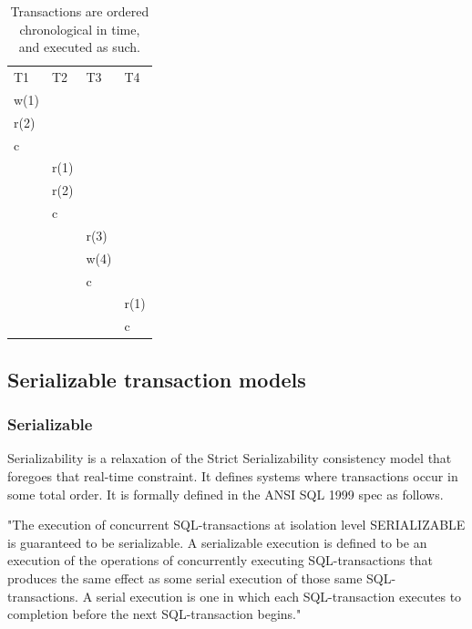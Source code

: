 \documentclass[a4paper,10pt,titlepage]{report}
\begin{document}
    \begin{table}[h]
        \begin{tabular}{l|l|l|l}
            T1   & T2   & T3   & T4   \\
            w(1) &      &      &      \\
            r(2) &      &      &      \\
            c    &      &      &      \\
            & r(1) &      &      \\
            & r(2) &      &      \\
            & c    &      &      \\
            &      & r(3) &      \\
            &      & w(4) &      \\
            &      & c    &      \\
            &      &      & r(1) \\
            &      &      & c
        \end{tabular}
        \caption{Transactions are ordered chronological in time, and executed as such.}

    \end{table}

    \subsection{Serializable transaction models}

    \subsubsection{Serializable}

    Serializability is a relaxation of the Strict Serializability consistency model that foregoes that real-time constraint. It defines systems where transactions occur in some total order. It is formally defined in the ANSI SQL 1999 spec as follows.
    
    \begin{displayquote}
    "The execution of concurrent SQL-transactions at isolation level SERIALIZABLE is guaranteed to be serializable. A serializable execution is defined to be an execution of the operations of concurrently executing SQL-transactions that produces the same effect as some serial execution of those same SQL-transactions. A serial execution is one in which each SQL-transaction executes to completion before the next SQL-transaction begins."\cite{ansisql1999}\\
    \end{displayquote}
    \vspace{5mm}
\end{document}
